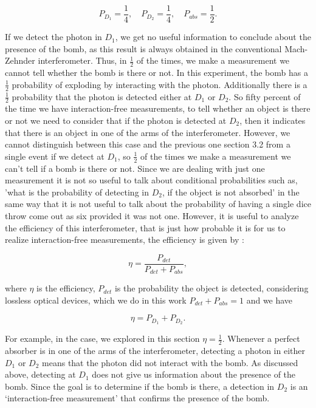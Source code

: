 \documentclass[12pt]{book}
\begin{document}
\begin{equation}
P_{D_{1}}=\frac{1}{4},\quad P_{D_{2}}=\frac{1}{4}, \quad P_{abs}=\frac{1}{2}.
\end{equation}



If we detect the photon in $D_{1}$, we get no useful information to conclude about the presence of the bomb, as this result is always obtained in the conventional Mach-Zehnder interferometer. Thus, in $\frac{1}{2}$ of the times, we make a measurement we cannot tell whether the bomb is there or not. In this experiment, the bomb has a $\frac{1}{2}$ probability of exploding by interacting with the photon. Additionally there is a $\frac{1}{2}$ probability that the photon is detected either at $D_{1}$ or $D_{2}$. So fifty percent of the time we have interaction-free measurements, to tell whether an object is there or not we need to consider that if the photon is detected at $D_{2}$, then it indicates that there is an object in one of the arms of the interferometer. However, we cannot distinguish between this case and the previous one section 3.2 from a single event if we detect at $D_{1}$, so $\frac{1}{2}$ of the times we make a measurement we can't tell if a bomb is there or not. Since we are dealing with just one measurement it is not so useful to talk about conditional probabilities such as, 'what is the probability of detecting in $D_{2}$, if the object is not absorbed' in the same way that it is not useful to talk about the probability of having a single dice throw come out as six provided it was not one. However, it is useful to analyze the efficiency of this interferometer, that is just how probable it is for us to realize interaction-free measurements, the efficiency is given by \cite{5}:

\begin{equation}
\eta=\frac{P_{det}}{P_{det}+P_{abs}},
\end{equation}

where $\eta$ is the efficiency, $P_{det}$ is the probability the object is detected, considering lossless optical devices, which we do in this work $P_{det}+P_{abs}=1$ and we have

\begin{equation}
\eta=P_{D_{1}}+P_{D_{2}}.
\end{equation}

For example, in the case, we explored in this section $\eta=\frac{1}{2}$.  Whenever a perfect absorber is in one of the arms of the interferometer, detecting a photon in either $D_1$ or $D_2$ means that the photon did not interact with the bomb. As discussed above, detecting at $D_1$ does not give us information about the presence of the bomb. Since the goal is to determine if the bomb is there, a detection in $D_2$ is an ‘interaction-free measurement’ that confirms the presence of the bomb.
  
\end{document}
